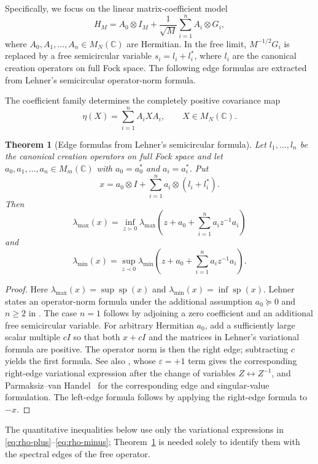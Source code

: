 \documentclass{article}
\newtheorem{theorem}{Theorem}[section]
\newcommand{\C}{\mathbb C}
\begin{document}
Specifically, we focus on the linear matrix-coefficient model
\[
	H_M=A_0\otimes I_M+\frac1{\sqrt M}\sum_{i=1}^n A_i\otimes G_i,
\]
where $A_0,A_1,\ldots,A_n\in M_N(\C)$ are Hermitian.  In the
free limit, $M^{-1/2}G_i$ is replaced by a free semicircular variable
$s_i=l_i+l_i^*$, where $l_i$ are the canonical creation operators on full Fock
space.  The following edge formulas are extracted from Lehner's semicircular
operator-norm formula.

The coefficient family determines the completely positive covariance map
\begin{equation}
	\label{eq:covariance-map}
	\eta(X)=\sum_{i=1}^n A_iXA_i,\qquad X\in M_N(\C).
\end{equation}

\begin{theorem}[Edge formulas from Lehner's semicircular formula]
	\label{thm:lehner}
	Let $l_1,\ldots,l_n$ be the canonical creation operators on full Fock space and
	let $a_0,a_1,\ldots,a_n\in M_m(\C)$ with $a_0=a_0^*$ and $a_i=a_i^*$.  Put
	\[
		x=a_0\otimes I+\sum_{i=1}^n a_i\otimes(l_i+l_i^*).
	\]
	Then
	\[
		\lambda_{\max}(x)
		=
		\inf_{z\succ0}\lambda_{\max}\left(z+a_0+\sum_{i=1}^n a_iz^{-1}a_i\right)
	\]
	and
	\[
		\lambda_{\min}(x)
		=
		\sup_{z\prec0}\lambda_{\min}\left(z+a_0+\sum_{i=1}^n a_iz^{-1}a_i\right).
	\]
\end{theorem}

\begin{proof}
	Here \(\lambda_{\max}(x)=\sup\operatorname{sp}(x)\) and
	\(\lambda_{\min}(x)=\inf\operatorname{sp}(x)\).
	Lehner states an operator-norm formula under the additional assumption
	\(a_0\succeq0\) and \(n\ge2\) in \cite[Corollary~1.5]{Lehner}.  The case
	\(n=1\) follows by adjoining a zero coefficient and an additional free
	semicircular variable.  For arbitrary Hermitian \(a_0\), add a sufficiently
	large scalar multiple \(cI\) so that both \(x+cI\) and the matrices in
	Lehner's variational formula are positive.  The operator norm is then the
	right edge; subtracting \(c\) yields the first formula.  See also
	\cite[Lemma~2.4]{BBvH2023}, whose \(\varepsilon=+1\) term gives the
	corresponding right-edge variational expression after the change of variables
	\(Z\leftrightarrow Z^{-1}\), and Parmaksiz--van
	Handel~\cite{ParmaksizVanHandel2025} for the corresponding edge and
	singular-value formulation.  The left-edge formula follows by applying the
	right-edge formula to \(-x\).
\end{proof}

The quantitative inequalities below use only the variational expressions in
\eqref{eq:rho-plus}--\eqref{eq:rho-minus}; Theorem~\ref{thm:lehner} is needed
solely to identify them with the spectral edges of the free operator.
\end{document}
